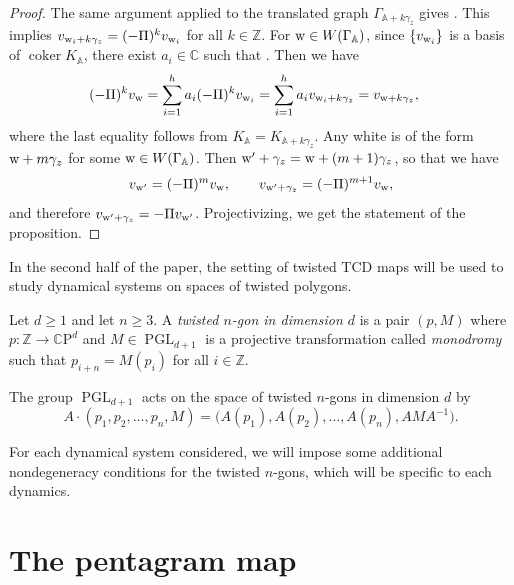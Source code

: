 \documentclass[pdftex]{sigma}
\numberwithin{equation}{section}
\newcommand{\Z}{{\mathbb Z}}
\newcommand{\C}{{\mathbb C}}
\newcommand{\CP}{{\mathbb C\mathrm P}}
\newcommand{\A}{{\mathbb A}}
\newcommand{\PGL}{\operatorname{PGL}}
\newcommand{\ra}{\rightarrow}
\newcommand{\w}{{\rm w}}
\DeclareMathOperator{\coker}{coker}
\begin{document}
\begin{proof}
		The same argument applied to the translated graph $\Gamma_{\A+k \gamma_z}$ gives . This implies $v_{{\rm w}_i+k\gamma_z}=(-\Pi{})^k v_{{\rm w}_i}$ for all $k \in \Z$.
		For ${\rm w} \in W(\Gamma_{ \A})$, since $\{v_{\w_i}\}$ is a basis {of $\coker K_\A$}, there exist $a_i\in\C$ such that . Then we have
  \begin{align*}(-\Pi{})^k v_{{\rm w}}&=\sum_{i=1}^h a_i (-\Pi{})^k v_{{\rm w}_i} = \sum_{i=1}^h a_i v_{{\rm w}_i+k\gamma_z} =v_{{\rm w}+k\gamma_z},
		\end{align*}
		where the last equality follows from $K_{\A}{}=K_{{\A+ k \gamma_z}}{}$. Any white \smash{${\rm w}'\in W\bigl(\Gamma_{\widehat \A}\bigr)$} is of the form~${\rm w}+m\gamma_z$ for some ${\rm w} \in W(\Gamma_{\A})$. Then ${\rm w}'+\gamma_z={\rm w}+(m+1) \gamma_z$, so that we have
		\[
		v_{{\rm w}'}=(-\Pi{})^m v_{{\rm w}}, \qquad v_{{\rm w}'+\gamma_z}=(-\Pi{})^{m+1}v_{\rm w},
		\]
		and therefore $v_{{\rm w}'+\gamma_z}=-\Pi{}v_{{\rm w}'}$. Projectivizing, we get the statement of the proposition.
	\end{proof}
	
	In the second half of the paper, the setting of twisted TCD maps will be used to study dynamical systems on spaces of twisted polygons.
	
	\begin{Definition}
		Let $d\geq1$ and let $n \geq 3$. A \emph{twisted $n$-gon in dimension $d$} is a pair $(p,M)$ where $p\colon \Z \ra \CP^d$ and $M \in \PGL_{d+1}$ is a projective transformation called \emph{monodromy} such that $p_{i+n}=M(p_i)$ for all $i \in \Z$.
		
		The group $\PGL_{d+1}$ acts on the space of twisted $n$-gons in dimension $d$ by
		\begin{equation}
			\label{eq:pglaction}
			A \cdot (p_1,p_2,\dots,p_n,M) = \big(A(p_1),A(p_2),\dots,A(p_n),AMA^{-1}\big).
		\end{equation}
	\end{Definition}
	
	For each dynamical system considered, we will impose some additional nondegeneracy conditions for the twisted $n$-gons, which will be specific to each dynamics.
	
\section{The pentagram map}\label{sec:pentagram}
	
\end{document}
